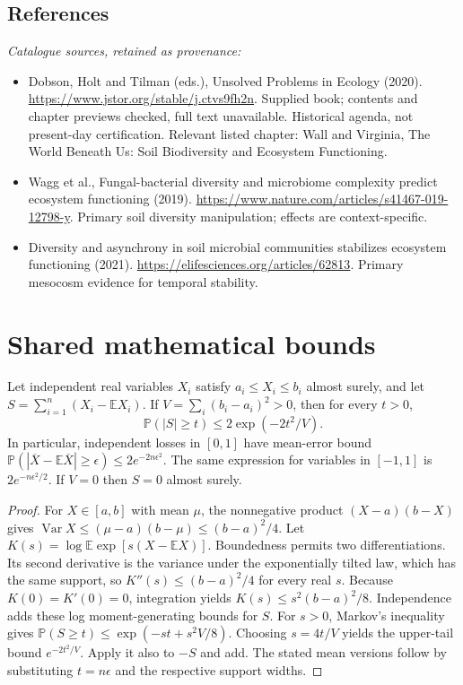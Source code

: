\documentclass[11pt]{article}
\begin{document}
\subsection{References}
\noindent\emph{Catalogue sources, retained as provenance:}
\begin{itemize}
\item Dobson, Holt and Tilman (eds.), Unsolved Problems in Ecology (2020). \url{https://www.jstor.org/stable/j.ctvs9fh2n}. Supplied book; contents and chapter previews checked, full text unavailable. Historical agenda, not present-day certification. Relevant listed chapter: Wall and Virginia, The World Beneath Us: Soil Biodiversity and Ecosystem Functioning.
\item Wagg et al., Fungal-bacterial diversity and microbiome complexity predict ecosystem functioning (2019). \url{https://www.nature.com/articles/s41467-019-12798-y}. Primary soil diversity manipulation; effects are context-specific.
\item Diversity and asynchrony in soil microbial communities stabilizes ecosystem functioning (2021). \url{https://elifesciences.org/articles/62813}. Primary mesocosm evidence for temporal stability.
\end{itemize}




\section{Shared mathematical bounds}\label{app:bounds}
\begin{lemma}\label{lem:bounded}
Let independent real variables $X_i$ satisfy $a_i\leq X_i\leq b_i$ almost surely,
and let $S=\sum_{i=1}^n(X_i-\mathbb{E} X_i)$. If
$V=\sum_i(b_i-a_i)^2>0$, then for every $t>0$,
\[
 \mathbb{P}(|S|\geq t)\leq 2\exp(-2t^2/V).
\]
In particular, independent losses in $[0,1]$ have mean-error bound
$\mathbb{P}(|\overline X-\mathbb{E}\overline X|\geq\epsilon)
\leq2e^{-2n\epsilon^2}$. The same expression for variables in $[-1,1]$
is $2e^{-n\epsilon^2/2}$. If $V=0$ then $S=0$ almost surely.
\end{lemma}
\begin{proof}
For $X\in[a,b]$ with mean $\mu$, the nonnegative product
$(X-a)(b-X)$ gives
$\operatorname{Var} X\leq(\mu-a)(b-\mu)\leq(b-a)^2/4$.
Let $K(s)=\log\mathbb{E}\exp[s(X-\mathbb{E} X)]$.
Boundedness permits two differentiations. Its second derivative is the variance
under the exponentially tilted law, which has the same support, so
$K''(s)\leq(b-a)^2/4$ for every real $s$.
Because $K(0)=K'(0)=0$, integration yields
$K(s)\leq s^2(b-a)^2/8$.
Independence adds these log moment-generating bounds for $S$.
For $s>0$, Markov's inequality gives
$\mathbb{P}(S\geq t)\leq\exp(-st+s^2V/8)$.
Choosing $s=4t/V$ yields the upper-tail bound $e^{-2t^2/V}$.
Apply it also to $-S$ and add. The stated mean versions follow by substituting
$t=n\epsilon$ and the respective support widths.
\end{proof}
\end{document}
